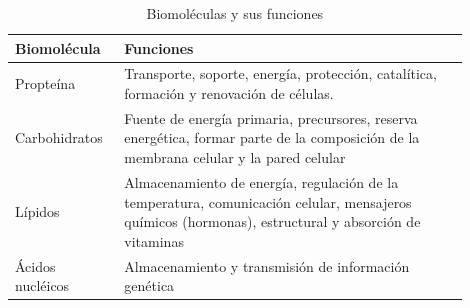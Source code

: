 \begin{table}[H]
\centering
\caption{Biomoléculas y sus funciones}
\label{tab:biomoléculas_funciones}
\begin{threeparttable}
{
\begin{tabular}{p{0.2\linewidth}p{0.7\linewidth}}\hline

    \textbf{Biomolécula} & \textbf{Funciones} \\ \hline
    
    Propteína & Transporte, soporte, energía, protección, catalítica, formación y renovación de células. \\
    Carbohidratos & Fuente de energía primaria, precursores, reserva energética, formar parte de la composición de la membrana celular y la pared celular \\
    Lípidos & Almacenamiento de energía, regulación de la temperatura, comunicación celular, mensajeros químicos (hormonas), estructural y absorción de vitaminas \\
    Ácidos nucléicos &Almacenamiento y transmisión de información genética \\
    
    \hline
\end{tabular}
}
\begin{tablenotes} %
    \item[] 
\end{tablenotes}
\end{threeparttable}
\end{table}